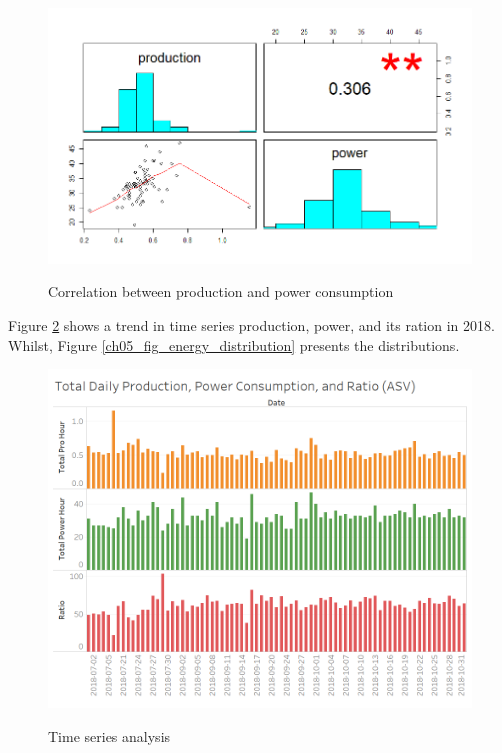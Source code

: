 \begin{figure}[!htb]
	\includegraphics[scale=0.6]{figures/ch05_fig_energy_correlation} \\
	\caption{Correlation between production and power consumption}
	\label{ch05_fig_energy_correlation} 
\end{figure}

Figure \ref{ch05_fig_energy_analysis} shows a trend in time series production, power, and its ration in 2018. Whilst, Figure \ref{ch05_fig_energy_distribution} presents the distributions.


\begin{figure}[!htb]
	\includegraphics[width=\textwidth]{figures/ch05_fig_energy_analysis} \\
	\caption{Time series analysis}
	\label{ch05_fig_energy_analysis} 
\end{figure}

